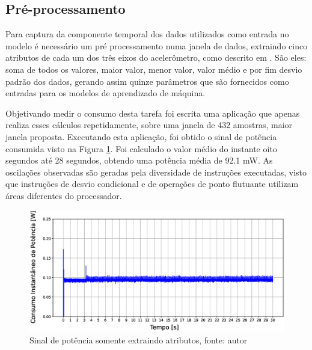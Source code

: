 \documentclass[a5paper]{ufsc-thesis}  %
\begin{document}
\subsection{Pré-processamento}
Para captura da componente temporal dos dados utilizados como entrada no modelo é necessário um pré processamento numa janela de dados, extraindo cinco atributos de cada um dos três eixos do acelerômetro, como descrito em \cite{hyerarchical_ML}. São eles: soma de todos os valores, maior valor, menor valor, valor médio e por fim desvio padrão dos dados, gerando assim quinze parâmetros que são fornecidos como entradas para os modelos de aprendizado de máquina.

Objetivando medir o consumo desta tarefa foi escrita uma aplicação que apenas realiza esses cálculos repetidamente, sobre uma janela de 432 amostras, maior janela proposta. Executando esta aplicação, foi obtido o sinal de potência consumida visto na Figura \ref{fig:only_features}. Foi calculado o valor médio do instante oito segundos até 28 segundos, obtendo uma potência média de 92.1 mW. As oscilações observadas são geradas pela diversidade de instruções executadas, visto que instruções de desvio condicional e de operações de ponto flutuante utilizam áreas diferentes do processador.

\begin{figure}[!ht]
    \centering
    \includegraphics[width=1\linewidth]{imagens/only_features.eps}
    \caption{Sinal de potência somente extraindo atributos, fonte: autor}
    \label{fig:only_features}
\end{figure}
\end{document}
